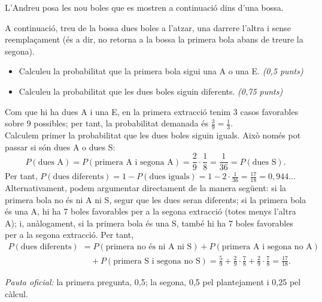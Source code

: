 L'Andreu posa les nou boles que es mostren a continuació dins d'una bossa.
\begin{center}
\end{center}

\begin{apartats}

A continuació, treu de la bossa dues boles a l'atzar, una darrere l'altra i sense reemplaçament (és a dir, no
retorna a la bossa la primera bola abans de treure la segona).
\begin{itemize}
\item[---] Calculeu la probabilitat que la primera bola sigui una A o una E. \emph{(0,5 punts)}
\item[---] Calculeu la probabilitat que les dues boles siguin diferents. \emph{(0,75 punts)}
\end{itemize}

\begin{solucio}
Com que hi ha dues A i una E, en la primera extracció tenim 3 casos favorables sobre 9 possibles; per tant,
la probabilitat demanada és $\frac39=\frac13$.\\
Calculem primer la probabilitat que les dues boles siguin iguals. Això només pot passar si són dues A o dues S:
\[
P(\text{dues A})=P(\text{primera A i segona A})=\frac29\cdot\frac18=\frac1{36}=P(\text{dues S}).
\]
Per tant, $P(\text{dues diferents})=1-P(\text{dues iguals})=1-2\cdot\frac1{36}=\frac{17}{18}=0{,}944\ldots$\\
Alternativament, podem argumentar directament de la manera següent: si la primera bola no és ni A ni S, segur
que les dues seran diferents; si la primera bola és una A, hi ha 7 boles favorables per a la segona extracció
(totes menys l'altra A); i, anàlogament, si la primera bola és una S, també hi ha 7 boles favorables per a la
segona extracció. Per tant,
\begin{align*}
P(\text{dues diferents})&=P(\text{primera no és ni A ni S})+P(\text{primera A i segona no A})\\
&\quad+P(\text{primera S i segona no S})=\frac59+\frac29\cdot\frac78+\frac29\cdot\frac78=\frac{17}{18}.
\end{align*}

\textit{Pauta oficial:} la primera pregunta, 0,5; la segona, 0,5 pel plantejament i 0,25 pel càlcul.
\end{solucio}


\end{apartats}
